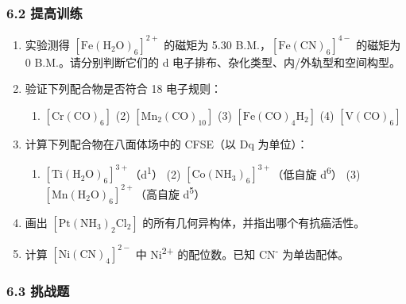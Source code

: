 \documentclass[a4paper,11pt]{ctexart}
\providecommand{\tightlist}{\setlength{\itemsep}{0pt}\setlength{\parskip}{0pt}}
\begin{document}
\subsubsection{6.2 提高训练}\label{ux63d0ux9ad8ux8badux7ec3}

\begin{enumerate}
\def\labelenumi{\arabic{enumi}.}
\setcounter{enumi}{4}
\item
  实验测得 \([\mathrm{Fe(H_2O)_6}]^{2+}\) 的磁矩为 5.30 B.M.，\([\mathrm{Fe(CN)_6}]^{4-}\) 的磁矩为 0 B.M.。请分别判断它们的 d 电子排布、杂化类型、内/外轨型和空间构型。
\item
  验证下列配合物是否符合 18 电子规则：

  \begin{enumerate}
  \def\labelenumii{(\arabic{enumii})}
  \tightlist
  \item
    \(\mathrm{[Cr(CO)_6]}\) (2) \(\mathrm{[Mn_2(CO)_{10}]}\) (3) \(\mathrm{[Fe(CO)_4H_2]}\) (4) \(\mathrm{[V(CO)_6]}\)
  \end{enumerate}
\item
  计算下列配合物在八面体场中的 CFSE（以 Dq 为单位）：

  \begin{enumerate}
  \def\labelenumii{(\arabic{enumii})}
  \tightlist
  \item
    \([\mathrm{Ti(H_2O)_6}]^{3+}\)（d\textsuperscript{1}） (2) \([\mathrm{Co(NH_3)_6}]^{3+}\)（低自旋 d\textsuperscript{6}） (3) \([\mathrm{Mn(H_2O)_6}]^{2+}\)（高自旋 d\textsuperscript{5}）
  \end{enumerate}
\item
  画出 \([\mathrm{Pt(NH_3)_2Cl_2}]\) 的所有几何异构体，并指出哪个有抗癌活性。
\item
  计算 \([\mathrm{Ni(CN)_4}]^{2-}\) 中 Ni\textsuperscript{2+} 的配位数。已知 CN\textsuperscript{-} 为单齿配体。
\end{enumerate}

\subsubsection{6.3 挑战题}\label{ux6311ux6218ux9898}
\end{document}
